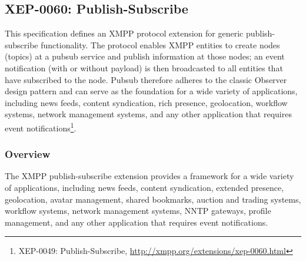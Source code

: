 \subsection{XEP-0060: Publish-Subscribe}
This specification defines an XMPP protocol extension for generic publish-subscribe functionality. The protocol enables XMPP entities to create nodes (topics) at a pubsub service and publish information at those nodes; an event notification (with or without payload) is then broadcasted to all entities that have subscribed to the node. Pubsub therefore adheres to the classic Observer design pattern and can serve as the foundation for a wide variety of applications, including news feeds, content syndication, rich presence, geolocation, workflow systems, network management systems, and any other application that requires event notifications\footnote{XEP-0049: Publish-Subscribe, \url{http://xmpp.org/extensions/xep-0060.html}}.

\subsubsection{Overview}
The XMPP publish-subscribe extension provides a framework for a wide variety of applications, including news feeds, content syndication, extended presence, geolocation, avatar management, shared bookmarks, auction and trading systems, workflow systems, network management systems, NNTP gateways, profile management, and any other application that requires event notifications.

